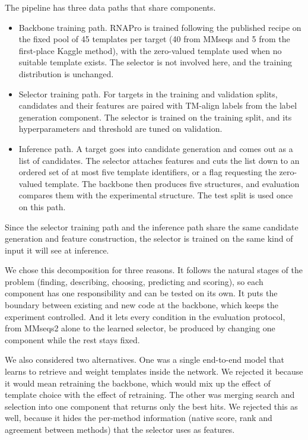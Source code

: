 \documentclass{FastFyp}
\begin{document}
The pipeline has three data paths that share components.

\begin{itemize}
  \item Backbone training path. RNAPro is trained following the published recipe on the fixed pool of 45 templates per target (40 from MMseqs and 5 from the first-place Kaggle method), with the zero-valued template used when no suitable template exists. The selector is not involved here, and the training distribution is unchanged.
  \item Selector training path. For targets in the training and validation splits, candidates and their features are paired with TM-align labels from the label generation component. The selector is trained on the training split, and its hyperparameters and threshold are tuned on validation.
  \item Inference path. A target goes into candidate generation and comes out as a list of candidates. The selector attaches features and cuts the list down to an ordered set of at most five template identifiers, or a flag requesting the zero-valued template. The backbone then produces five structures, and evaluation compares them with the experimental structure. The test split is used once on this path.
\end{itemize}

Since the selector training path and the inference path share the same candidate generation and feature construction, the selector is trained on the same kind of input it will see at inference.

We chose this decomposition for three reasons. It follows the natural stages of the problem (finding, describing, choosing, predicting and scoring), so each component has one responsibility and can be tested on its own. It puts the boundary between existing and new code at the backbone, which keeps the experiment controlled. And it lets every condition in the evaluation protocol, from MMseqs2 alone to the learned selector, be produced by changing one component while the rest stays fixed.

We also considered two alternatives. One was a single end-to-end model that learns to retrieve and weight templates inside the network. We rejected it because it would mean retraining the backbone, which would mix up the effect of template choice with the effect of retraining. The other was merging search and selection into one component that returns only the best hits. We rejected this as well, because it hides the per-method information (native score, rank and agreement between methods) that the selector uses as features.
\end{document}

